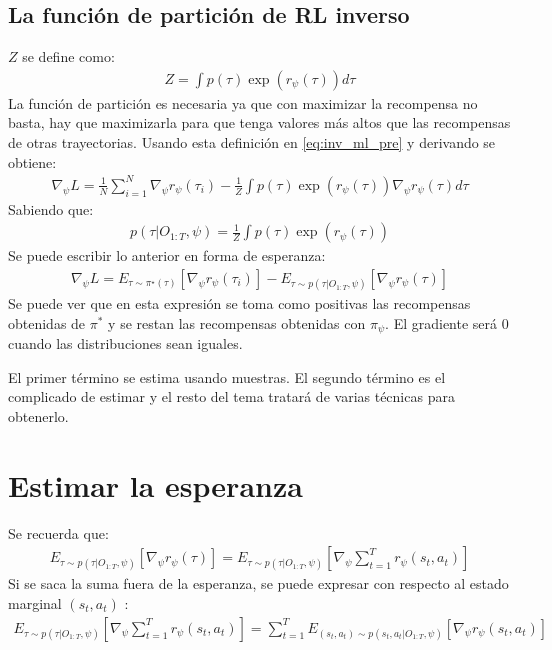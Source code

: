 \subsection{La función de partición de RL inverso}%
\label{sub:la_función_de_partición_de_rl_inverso}

$Z$ se define como:
\begin{align}
Z = \int p ( \tau ) \operatorname { exp } ( r _ { \psi } ( \tau ) ) d \tau
\end{align}
La función de partición es necesaria ya que con maximizar la recompensa no basta, hay que
maximizarla para que tenga valores más altos que las recompensas de otras trayectorias. Usando
esta definición en \ref{eq:inv_ml_pre} y derivando se obtiene:
\begin{align}
\nabla _ { \psi } L = \frac { 1 } { N } \sum _ { i = 1 } ^ { N } \nabla _ { \psi } r _ { \psi } ( \tau _ { i } ) - \frac { 1 } { Z } \int p ( \tau ) \operatorname { exp } ( r _ { \psi } ( \tau ) ) \nabla _ { \psi } r _ { \psi } ( \tau ) d \tau
\end{align}
Sabiendo que:
\begin{align}
    p(\tau|O_{1:T},\psi)= \frac{1}{Z} \int p(\tau)\exp(r_\psi(\tau))
\end{align}
Se puede escribir lo anterior en forma de esperanza:
\begin{align}
    \label{eq:inv_grad}
\nabla _ { \psi } L = E _ { \tau \sim \pi ^ { \star } ( \tau ) } [ \nabla _ { \psi } r _ { \psi } ( \tau _ { i } ) ] - E _ { \tau \sim p ( \tau | O _ { 1 : T } , \psi ) } [ \nabla _ { \psi } r _ { \psi } ( \tau ) ]
\end{align}
Se puede ver que en esta expresión se toma como positivas las recompensas obtenidas de $\pi^*$
y se restan las recompensas obtenidas con  $\pi_\psi$. El gradiente será 0 cuando las
distribuciones sean iguales.

El primer término se estima usando muestras. El segundo término es el complicado de estimar
y el resto del tema tratará de varias técnicas para obtenerlo.

\section{Estimar la esperanza}%
\label{sec:estimar_la_esperanza}

Se recuerda que:
\begin{align}
E _ { \tau \sim p ( \tau | O _ { 1 : T } , \psi ) } [ \nabla _ { \psi } r _ { \psi } ( \tau ) ] =
E _ { \tau \sim p ( \tau | O _ { 1 : T } , \psi ) } \left[ \nabla _ { \psi } \sum _ { t = 1 } ^ {
    T } r _ { \psi } ( s _ { t } , a _ { t } ) \right]
\end{align}
Si se saca la suma fuera de la esperanza, se puede expresar con respecto al estado marginal
$(s_t,a_t)$ :
\begin{align}
E _ { \tau \sim p ( \tau | O _ { 1 : T } , \psi ) } \left[ \nabla _ { \psi } \sum _ { t = 1 } ^ {
    T } r _ { \psi } ( s _ { t } , a _ { t } ) \right]
= \sum _ { t = 1 } ^ { T } E _ { ( s _ { t } , a _ { t } ) \sim p ( s _ { t } , a _ { t } | O _ { 1 : T } , \psi ) } [ \nabla _ { \psi } r _ { \psi } ( s _ { t } , a _ { t } ) ]
\end{align}

